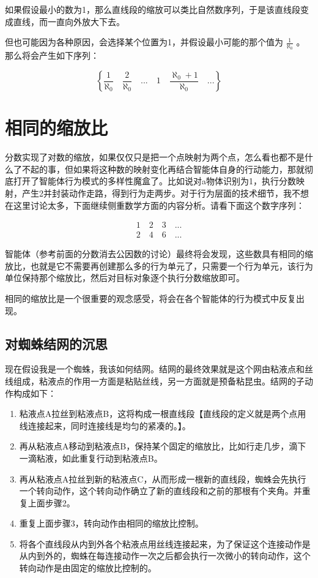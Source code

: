 \documentclass[12pt,oneside]{book}
\begin{document}
如果假设最小的数为1，那么直线段的缩放可以类比自然数序列，于是该直线段变成直线，而一直向外放大下去。

但也可能因为各种原因，会选择某个位置为1，并假设最小可能的那个值为 $\frac{1}{\aleph_0}$ 。那么将会产生如下序列：

\[
\left\{\frac{1}{\aleph_0} \quad \frac{2}{\aleph_0} \quad  ...  \quad 1 \quad \frac{\aleph_0 + 1}{\aleph_0} \quad ... \right\}
\]





\section{相同的缩放比}
分数实现了对数的缩放，如果仅仅只是把一个点映射为两个点，怎么看也都不是什么了不起的事，但如果将这种数的映射变化再结合智能体自身的行动能力，那就彻底打开了智能体行为模式的多样性魔盒了。比如说对a物体识别为1，执行分数映射，产生2并封装动作走路，得到行为走两步。对于行为层面的技术细节，我不想在这里讨论太多，下面继续侧重数学方面的内容分析。请看下面这个数字序列：

\begin{align*}
1 \quad 2  \quad 3 \quad ... \\
2 \quad 4  \quad 6 \quad ...
\end{align*}


智能体（参考前面的分数消去公因数的讨论）最终将会发现，这些数具有相同的缩放比，也就是它不需要再创建那么多的行为单元了，只需要一个行为单元，该行为单位保持那个缩放比，然后对目标对象逐个执行分数缩放即可。

相同的缩放比是一个很重要的观念感受，将会在各个智能体的行为模式中反复出现。


\subsection{对蜘蛛结网的沉思}
现在假设我是一个蜘蛛，我该如何结网。结网的最终效果就是这个网由粘液点和丝线组成，粘液点的作用一方面是粘贴丝线，另一方面就是预备粘昆虫。结网的子动作构成如下：

\begin{enumerate}
\item 粘液点A拉丝到粘液点B，这将构成一根直线段【直线段的定义就是两个点用线连接起来，同时连接线是均匀的紧凑的。】。
\item 再从粘液点A移动到粘液点B，保持某个固定的缩放比，比如行走几步，滴下一滴粘液，如此重复行动到粘液点B。
\item 再从粘液点A拉丝到新的粘液点C，从而形成一根新的直线段，蜘蛛会先执行一个转向动作，这个转向动作确立了新的直线段和之前的那根有个夹角。并重复上面步骤2。
\item 重复上面步骤3，转向动作由相同的缩放比控制。
\item 将各个直线段从内到外各个粘液点用丝线连接起来，为了保证这个连接动作是从内到外的，蜘蛛在每连接动作一次之后都会执行一次微小的转向动作，这个转向动作是由固定的缩放比控制的。
\end{enumerate}
\end{document}

